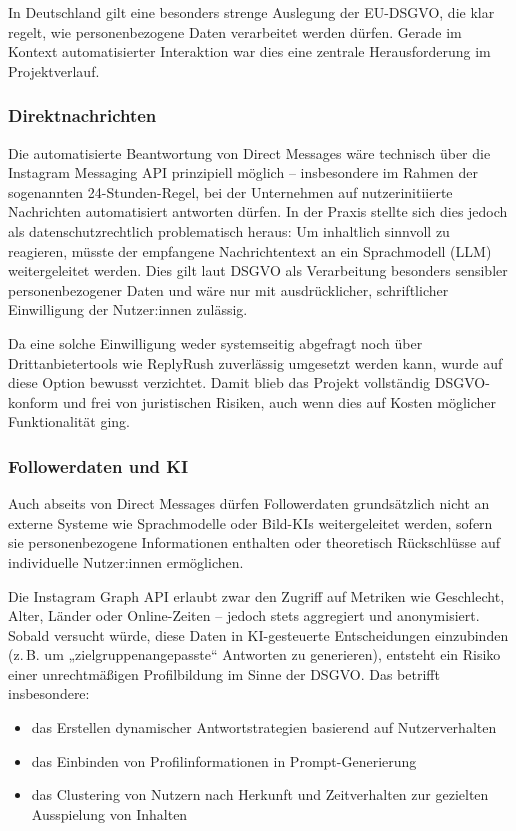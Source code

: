 \documentclass[a4paper,12pt]{article}
\begin{document}
In Deutschland gilt eine besonders strenge Auslegung der EU-DSGVO, die klar regelt, wie personenbezogene Daten verarbeitet werden dürfen. Gerade im Kontext automatisierter Interaktion war dies eine zentrale Herausforderung im Projektverlauf.

\subsubsection*{Direktnachrichten}  
Die automatisierte Beantwortung von Direct Messages wäre technisch über die Instagram Messaging API prinzipiell möglich – insbesondere im Rahmen der sogenannten 24-Stunden-Regel, bei der Unternehmen auf nutzerinitiierte Nachrichten automatisiert antworten dürfen. In der Praxis stellte sich dies jedoch als datenschutzrechtlich problematisch heraus: Um inhaltlich sinnvoll zu reagieren, müsste der empfangene Nachrichtentext an ein Sprachmodell (LLM) weitergeleitet werden. Dies gilt laut DSGVO als Verarbeitung besonders sensibler personenbezogener Daten und wäre nur mit ausdrücklicher, schriftlicher Einwilligung der Nutzer:innen zulässig.

Da eine solche Einwilligung weder systemseitig abgefragt noch über Drittanbietertools wie ReplyRush zuverlässig umgesetzt werden kann, wurde auf diese Option bewusst verzichtet. Damit blieb das Projekt vollständig DSGVO-konform und frei von juristischen Risiken, auch wenn dies auf Kosten möglicher Funktionalität ging.

\subsubsection*{Followerdaten und KI}

Auch abseits von Direct Messages dürfen Followerdaten grundsätzlich nicht an externe Systeme wie Sprachmodelle oder Bild-KIs weitergeleitet werden, sofern sie personenbezogene Informationen enthalten oder theoretisch Rückschlüsse auf individuelle Nutzer:innen ermöglichen.

Die Instagram Graph API erlaubt zwar den Zugriff auf Metriken wie Geschlecht, Alter, Länder oder Online-Zeiten – jedoch stets aggregiert und anonymisiert. Sobald versucht würde, diese Daten in KI-gesteuerte Entscheidungen einzubinden (z.\,B. um „zielgruppenangepasste“ Antworten zu generieren), entsteht ein Risiko einer unrechtmäßigen Profilbildung im Sinne der DSGVO. Das betrifft insbesondere:

\begin{itemize}
    \item das Erstellen dynamischer Antwortstrategien basierend auf Nutzerverhalten
    \item das Einbinden von Profilinformationen in Prompt-Generierung
    \item das Clustering von Nutzern nach Herkunft und Zeitverhalten zur gezielten Ausspielung von Inhalten
\end{itemize}
\end{document}

